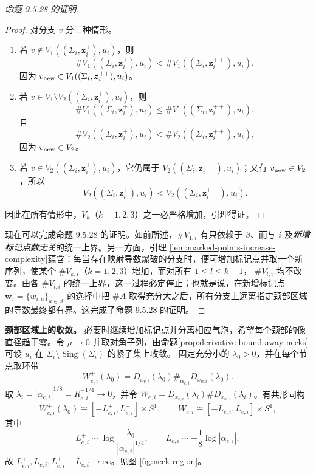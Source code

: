 \begin{proof}[命题 9.5.28 的证明]
\begin{proof}
对分支 $v$ 分三种情形。
\begin{enumerate}
 \item 若 $v\notin V_1((\Sigma_i,\boldsymbol z_i^+),u_i)$，则
 \[
  \#V_1((\Sigma_i,\boldsymbol z_i^+),u_i)
  <\#V_1((\Sigma_i,\boldsymbol z_i^{++}),u_i),
 \]
 因为 $v_{\rm new}\in V_1((\Sigma_i,\boldsymbol z_i^{++}),u_i)$。
 \item 若 $v\in V_1\setminus V_2((\Sigma_i,\boldsymbol z_i^+),u_i)$，则
 \[
  \#V_1((\Sigma_i,\boldsymbol z_i^+),u_i)
  \le\#V_1((\Sigma_i,\boldsymbol z_i^{++}),u_i),
 \]
 且
 \[
  \#V_2((\Sigma_i,\boldsymbol z_i^+),u_i)
  <\#V_2((\Sigma_i,\boldsymbol z_i^{++}),u_i),
 \]
 因为 $v_{\rm new}\in V_2$。
 \item 若 $v\in V_2((\Sigma_i,\boldsymbol z_i^+),u_i)$，它仍属于
 $V_2((\Sigma_i,\boldsymbol z_i^{++}),u_i)$；又有
 $v_{\rm new}\in V_2$，所以
 \[
  V_2((\Sigma_i,\boldsymbol z_i^+),u_i)
  <V_2((\Sigma_i,\boldsymbol z_i^{++}),u_i).
 \]
\end{enumerate}
因此在所有情形中，$V_k$（$k=1,2,3$）之一必严格增加，引理得证。
\end{proof}

现在可以完成命题 9.5.28 的证明。如前所述，$\#V_{1,i}$ 有只依赖于 $\beta$、而与
$i$ 及\emph{新增标记点数无关}的统一上界。另一方面，引理
\ref{lem:marked-points-increase-complexity}蕴含：每当存在映射导数爆破的分支时，便可增加标记点并取一个新序列，使某个
$\#V_{k,i}$（$k=1,2,3$）增加，而对所有 $1\le l\le k-1$，
$\#V_{l,i}$ 均不改变。由各 $\#V_{l,i}$ 的统一上界，这一过程必定停止；也就是说，在新增标记点
$\boldsymbol w_i=\{w_{i,a}\}_{a\in A}$ 的选择中把 $\#A$ 取得充分大之后，所有分支上远离指定颈部区域的导数最终都有界。这完成了命题 9.5.28 的证明。
\end{proof}

\textbf{颈部区域上的收敛。}
必要时继续增加标记点并分离相应气泡，希望每个颈部的像直径趋于零。令
$\mu\to0$ 并取对角子列，由命题\ref{prop:derivative-bound-away-necks}可设
$u_i$ 在 $\Sigma_i\setminus\operatorname{Sing}(\Sigma_i)$ 的紧子集上收敛。
固定充分小的 $\lambda_0>0$，并在每个节点取环带
\[
 W_{e,i}^+(\lambda_0)=
 D_{x_{v,i}}(\lambda_0)\#_{\alpha_{e,i}}D_{x_{w,i}}(\lambda_0).
\]
取 $\lambda_i=|\alpha_{e,i}|^{1/8}=R_{e,i}^{-1/4}\to0$，并令
$W_{e,i}=D_{x_{v,i}}(\lambda_i)\#D_{x_{w,i}}(\lambda_i)$。有共形同构
\[
 W_{e,i}^+(\lambda_0)\cong[-L_{e,i}^+,L_{e,i}^+]\times S^1,
 \qquad W_{e,i}\cong[-L_{e,i},L_{e,i}]\times S^1,
\]
其中
\[
 L_{e,i}^+\sim\log\frac{\lambda_0}{|\alpha_{e,i}|^{1/4}},
 \qquad L_{e,i}\sim-\frac18\log|\alpha_{e,i}|,
\]
故 $L_{e,i}^+,L_{e,i},L_{e,i}^+-L_{e,i}\to\infty$。见图
\ref{fig:neck-region}。

